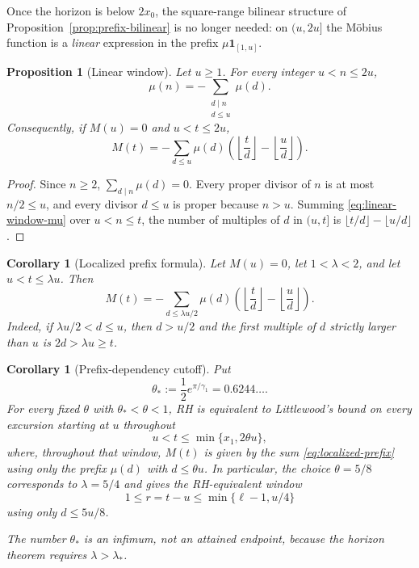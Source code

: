\documentclass[11pt]{amsart}
\numberwithin{equation}{section}
\theoremstyle{plain}
\newtheorem{proposition}[theorem]{Proposition}
\newtheorem{corollary}[theorem]{Corollary}
\theoremstyle{definition}
\theoremstyle{remark}
\begin{document}
Once the horizon is below $2x_0$, the square-range bilinear structure of
Proposition~\ref{prop:prefix-bilinear} is no longer needed: on $(u,2u]$ the
M\"obius function is a \emph{linear} expression in the prefix
$\mu\mathbf 1_{[1,u]}$.

\begin{proposition}[Linear window]
\label{prop:linear-window}
Let $u\ge1$. For every integer $u<n\le2u$,
\begin{equation}
\label{eq:linear-window-mu}
\mu(n)=-\sum_{\substack{d\mid n\\ d\le u}}\mu(d).
\end{equation}
Consequently, if $M(u)=0$ and $u<t\le2u$,
\begin{equation}
\label{eq:linear-window-M}
M(t)=-\sum_{d\le u}\mu(d)\left(\left\lfloor\frac td\right\rfloor
-\left\lfloor\frac ud\right\rfloor\right).
\end{equation}
\end{proposition}

\begin{proof}
Since $n\ge2$, $\sum_{d\mid n}\mu(d)=0$. Every proper divisor of $n$ is at
most $n/2\le u$, and every divisor $d\le u$ is proper because $n>u$. Summing
\eqref{eq:linear-window-mu} over $u<n\le t$, the number of multiples of $d$
in $(u,t]$ is $\lfloor t/d\rfloor-\lfloor u/d\rfloor$.
\end{proof}

\begin{corollary}[Localized prefix formula]
\label{cor:localized-prefix}
Let $M(u)=0$, let $1<\lambda<2$, and let $u<t\le\lambda u$.  Then
\begin{equation}
\label{eq:localized-prefix}
M(t)=-\sum_{d\le\lambda u/2}\mu(d)
\left(\left\lfloor\frac td\right\rfloor-
\left\lfloor\frac ud\right\rfloor\right).
\end{equation}
Indeed, if $\lambda u/2<d\le u$, then $d>u/2$ and the first multiple of
$d$ strictly larger than $u$ is $2d>\lambda u\ge t$.
\end{corollary}

\begin{corollary}[Prefix-dependency cutoff]
\label{cor:prefix-cutoff}
Put
\[
\theta_*:=\frac12e^{\pi/\gamma_1}=0.6244\ldots .
\]
For every fixed $\theta$ with $\theta_*<\theta<1$, RH is equivalent to
Littlewood's bound on every excursion starting at $u$ throughout
\[
u<t\le\min\{x_1,2\theta u\},
\]
where, throughout that window, $M(t)$ is given by the sum
\eqref{eq:localized-prefix} using only the prefix
$\mu(d)$ with $d\le\theta u$.  In particular, the choice
$\theta=5/8$ corresponds to $\lambda=5/4$ and gives the RH-equivalent
window
\[
1\le r=t-u\le\min\{\ell-1,u/4\}
\]
using only $d\le5u/8$.

The number $\theta_*$ is an infimum, not an attained endpoint, because the
horizon theorem requires $\lambda>\lambda_*$.
\end{corollary}
\end{document}
